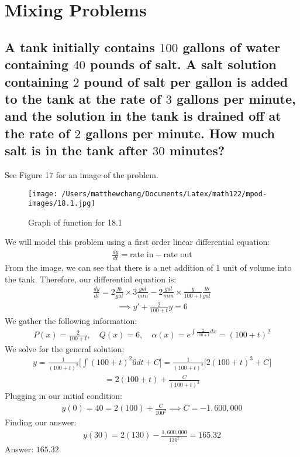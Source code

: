 \documentclass{article}
\begin{document}
\section{Mixing Problems}
\subsection{A tank initially contains $100$ gallons of water containing $40$ pounds of salt. A salt solution containing $2$ pound of salt per gallon is added to the tank at the rate of $3$ gallons per minute, and the solution in the tank is drained off at the rate of $2$ gallons per minute. How much salt is in the tank after $30$ minutes?}
See Figure 17 for an image of the problem. \\[10pt]
\begin{figure}
	\centering
	\texttt{[image: /Users/matthewchang/Documents/Latex/math122/mpod-images/18.1.jpg]}
	\caption{Graph of function for 18.1}
\end{figure}
We will model this problem using a first order linear differential equation:
\begin{align*}
	\frac{dy}{dt} = \text{rate in} - \text{rate out}
\end{align*}
From the image, we can see that there is a net addition of 1 unit of volume into the tank. Therefore, our differential equation is:
\begin{align*}
	\frac{dy}{dt} = 2 \frac{lb}{gal} \times 3 \frac{gal}{min} - 2 \frac{gal}{min} \times \frac{y}{100 + t} \frac{lb}{gal}
\end{align*}
\begin{align*}
	\implies y' + \frac{2}{100 + t}y = 6
\end{align*}
We gather the following information:
\begin{align*}
	P(x) = \frac{2}{100 + t}, \quad Q(x) = 6, \quad \alpha(x) = e^{\int{\frac{2}{100 + t} dx}} = (100 + t)^2
\end{align*}
We solve for the general solution:
\begin{align*}
	y = \frac{1}{(100 + t)^2} \bigg[ \int{(100 + t)^2 6 dt} + C \bigg] = \frac{1}{(100 + t)^2} \bigg[ 2(100 + t)^3 + C \bigg]
\end{align*}
\begin{align*}
	= 2(100 + t) + \frac{C}{(100 + t)^3}
\end{align*}
Plugging in our initial condition:
\begin{align*}
	y(0) = 40 = 2(100) + \frac{C}{100^2} \implies C = -1,600,000
\end{align*}
Finding our answer:
\begin{align*}
	y(30) = 2(130) - \frac{1,600,000}{130^2} = 165.32
\end{align*}
Answer: $165.32$
\end{document}

